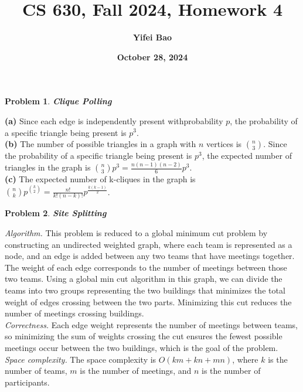 \documentclass[11pt]{exam}
\title{\Large{\textbf{CS 630, Fall 2024, Homework 4}}}
\author{\textbf{Yifei Bao}}
\date{\textbf{October 28, 2024}}
\newtheorem{problem}{Problem}
\begin{document}
\maketitle

\begin{problem}
    \textbf{Clique Polling} 
\end{problem} 

\noindent\textbf{(a)}
Since each edge is independently present withprobability $p$, the probability of a specific triangle being present is $p^3$.\\
\noindent\textbf{(b)}
The number of possible triangles in a graph with $n$ vertices is $\binom{n}{3}$. Since the probability of a specific triangle being present is $p^3$, the expected number of triangles in the graph is $\binom{n}{3}p^3=\frac{n(n-1)(n-2)}{6}p^3$.\\
\noindent\textbf{(c)}
The expected number of k-cliques in the graph is $\binom{n}{k}p^{\binom{k}{2}}=\frac{n!}{k!(n-k)!}p^{\frac{k(k-1)}{2}}$.\\

\begin{problem}
    \textbf{Site Splitting} 
\end{problem} 

\noindent\textit{Algorithm.}
This problem is reduced to a global minimum cut problem by constructing an undirected weighted graph, where each team is represented as a node, and an edge is added between any two teams that have meetings together. The weight of each edge corresponds to the number of meetings between those two teams. Using a global min cut algorithm in this graph, we can divide the teams into two groups representing the two buildings that minimizes the total weight of edges crossing between the two parts. Minimizing this cut reduces the number of meetings crossing buildings.\\


\noindent\textit{Correctness.}
Each edge weight represents the number of meetings between teams, so minimizing the sum of weights crossing the cut ensures the fewest possible meetings occur between the two buildings, which is the goal of the problem.
\\

\noindent\textit{Space complexity.}
The space complexity is $O(km+kn+mn)$, where $k$ is the number of teams, $m$ is the number of meetings, and $n$ is the number of participants.\\
\end{document}
